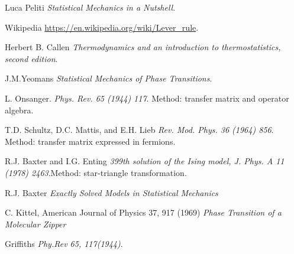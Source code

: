 
\cleardoublepage
{}
\begin{thebibliography}{99}


Luca Peliti
\textit{Statistical Mechanics in a Nutshell}.

Wikipedia 
\url{https://en.wikipedia.org/wiki/Lever_rule}.

Herbert B. Callen
\textit{Thermodynamics and an introduction to thermostatistics, second edition}.

J.M.Yeomans
\textit{Statistical Mechanics of Phase Transitions}.

L. Onsanger.
\textit{Phys. Rev. 65 (1944) 117}. Method: transfer matrix and operator algebra.

T.D. Schultz, D.C. Mattis, and E.H. Lieb
\textit{Rev. Mod. Phys. 36 (1964) 856}. Method: transfer matrix expressed in fermions.


R.J. Baxter and I.G. Enting
\textit{399th solution of the Ising model, J. Phys. A 11 (1978) 2463}.Method: star-triangle transformation. 

R.J. Baxter
\textit{Exactly Solved Models in Statistical Mechanics}

C. Kittel, American Journal of Physics 37, 917 (1969)
\textit{Phase Transition of a Molecular Zipper}

Griffiths
\textit{Phy.Rev 65, 117(1944)}. 

 

%

\end{thebibliography}
